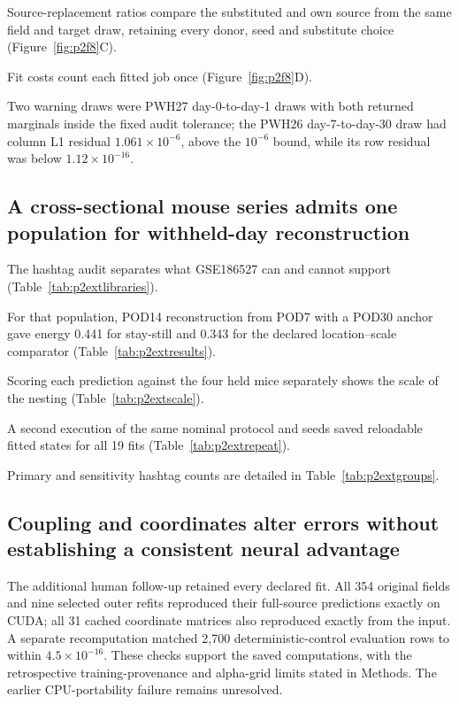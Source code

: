 \documentclass[10pt,a4paper]{article}
\begin{document}
Source-replacement ratios compare the substituted and own source from the same field and target draw, retaining every donor, seed and substitute choice (Figure~\ref{fig:p2f8}C).

Fit costs count each fitted job once (Figure~\ref{fig:p2f8}D).

Two warning draws were PWH27 day-0-to-day-1 draws with both returned marginals inside the fixed audit tolerance; the PWH26 day-7-to-day-30 draw had column L1 residual $1.061\times10^{-6}$, above the $10^{-6}$ bound, while its row residual was below $1.12\times10^{-16}$.

\subsection{A cross-sectional mouse series admits one population for withheld-day reconstruction}

The hashtag audit separates what GSE186527 can and cannot support (Table~\ref{tab:p2extlibraries}).

For that population, POD14 reconstruction from POD7 with a POD30 anchor gave energy 0.441 for stay-still and 0.343 for the declared location--scale comparator (Table~\ref{tab:p2extresults}).

Scoring each prediction against the four held mice separately shows the scale of the nesting (Table~\ref{tab:p2extscale}).

A second execution of the same nominal protocol and seeds saved reloadable fitted states for all 19 fits (Table~\ref{tab:p2extrepeat}).

Primary and sensitivity hashtag counts are detailed in Table~\ref{tab:p2extgroups}.

\subsection{Coupling and coordinates alter errors without establishing a consistent neural advantage}
The additional human follow-up retained every declared fit. All 354 original fields and nine selected outer refits reproduced their full-source predictions exactly on CUDA; all 31 cached coordinate matrices also reproduced exactly from the input. A separate recomputation matched 2,700 deterministic-control evaluation rows to within $4.5\times10^{-16}$. These checks support the saved computations, with the retrospective training-provenance and alpha-grid limits stated in Methods. The earlier CPU-portability failure remains unresolved.
\end{document}
